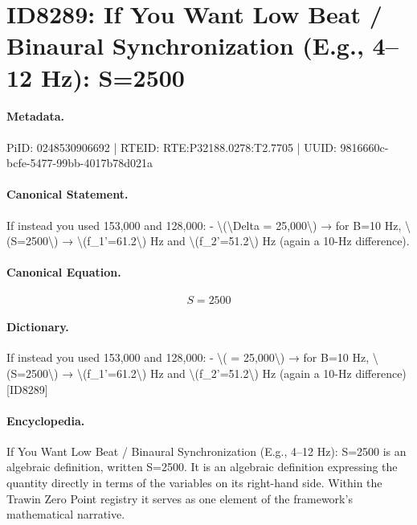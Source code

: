 \section*{ID8289: If You Want Low Beat / Binaural Synchronization (E.g., 4–12 Hz): S=2500}
\paragraph{Metadata.}
PiID: 0248530906692 | RTEID: RTE:P32188.0278:T2.7705 | UUID: 9816660c-bcfe-5477-99bb-4017b78d021a

\paragraph{Canonical Statement.}
If instead you used 153,000 and 128,000: - \textbackslash{}(\textbackslash{}Delta = 25,000\textbackslash{}) → for B=10 Hz, \textbackslash{}(S=2500\textbackslash{}) → \textbackslash{}(f\_1'=61.2\textbackslash{}) Hz and \textbackslash{}(f\_2'=51.2\textbackslash{}) Hz (again a 10-Hz difference).

\paragraph{Canonical Equation.}
\[
S=2500
\]

\paragraph{Dictionary.}
If instead you used 153,000 and 128,000: - \textbackslash{}( = 25,000\textbackslash{}) → for B=10 Hz, \textbackslash{}(S=2500\textbackslash{}) → \textbackslash{}(f\_1'=61.2\textbackslash{}) Hz and \textbackslash{}(f\_2'=51.2\textbackslash{}) Hz (again a 10-Hz difference) [ID8289]

\paragraph{Encyclopedia.}
If You Want Low Beat / Binaural Synchronization (E.g., 4–12 Hz): S=2500 is an algebraic definition, written S=2500. It is an algebraic definition expressing the quantity directly in terms of the variables on its right-hand side. Within the Trawin Zero Point registry it serves as one element of the framework's mathematical narrative.
